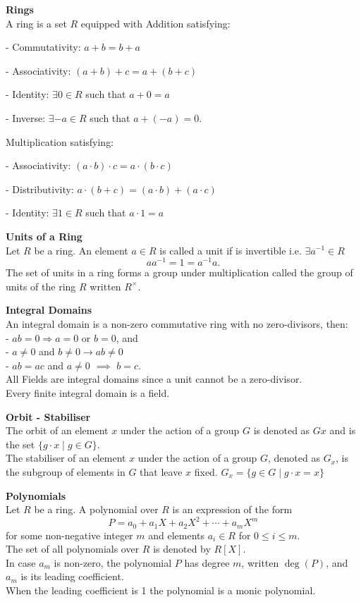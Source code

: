 \documentclass[a4paper, 10pt]{article}
\begin{document}
\begin{multicols*}{3}
\textbf{Rings}\\
A ring is a set \( R \) equipped with 
Addition satisfying:

- Commutativity: \( a + b = b + a \)

- Associativity: 
\( (a + b) + c = a + (b + c) \) 

- Identity: \(\exists 0 \in R \) such that \( a + 0 = a \) 

- Inverse: \(\exists  -a \in R \) such that \( a + (-a) = 0 \).

Multiplication satisfying:

- Associativity: \( (a \cdot b) \cdot c = a \cdot (b \cdot c) \) 

- Distributivity: \( a \cdot (b + c) = (a \cdot b) + (a \cdot c) \)

- Identity: \(\exists  1 \in R \) such that \( a \cdot 1 = a \) 

\textbf{Units of a Ring}\\
Let $R$ be a ring. An element $a \in R$ is called a unit if is invertible i.e. $\exists a^{-1} \in R$
$$
a a^{-1}=1=a^{-1} a .
$$
The set of units in a ring forms a group under multiplication called the group of units of the ring $R$ written $R^\times$.

\textbf{Integral Domains}\\
An integral domain is a non-zero commutative ring with no zero-divisors, then:\\
-  $a b=0 \Rightarrow a=0$ or $b=0$, and\\
-  $a \neq 0$ and $b \neq 0 \rightarrow a b \neq 0$\\
-  $a b=a c$ and $a \neq 0$ $\implies$ $b=c$.\\
All Fields are integral domains since a unit cannot be a zero-divisor. \\
Every finite integral domain is a field.

\textbf{Orbit - Stabiliser}\\
The orbit of an element $x$ under the action of a group $G$ is denoted as $Gx$ and is the set $\{g \cdot x \mid g \in G\}$.\\
The stabiliser of an element $x$ under the action of a group $G$, denoted as $G_x$, is the subgroup of elements in $G$ that leave $x$ fixed. $G_x=\{g \in G \mid g \cdot x=x\}$

\textbf{Polynomials}\\
Let $R$ be a ring. A polynomial over $R$ is an expression of the form
$$
P=a_0+a_1 X+a_2 X^2+\cdots+a_m X^m
$$
for some non-negative integer $m$ and elements $a_i \in R$ for $0 \leqslant i \leqslant m$. \\
The set of all polynomials over $R$ is denoted by $R[X]$. \\
In case $a_m$ is non-zero, the polynomial $P$ has degree $m$, written $\operatorname{deg}(P)$, and $a_m$ is its leading coefficient. \\
When the leading coefficient is 1 the polynomial is a monic polynomial.


\end{multicols*}
\end{document}
